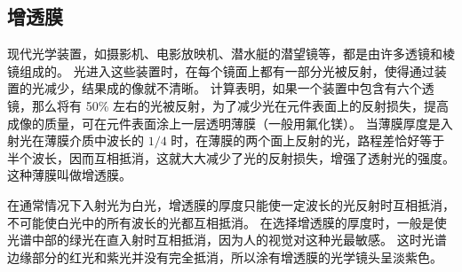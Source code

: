 \subsection{增透膜}

现代光学装置，如摄影机、电影放映机、潜水艇的潜望镜等，都是由许多透镜和棱镜组成的。
光进入这些装置时，在每个镜面上都有一部分光被反射，使得通过装置的光减少，结果成的像就不清晰。
计算表明，如果一个装置中包含有六个透镜，那么将有 50\% 左右的光被反射，为了减少光在元件表面上的反射损失，提高成像的质量，可在元件表面涂上一层透明薄膜（一般用氟化镁）。
当薄膜厚度是入射光在薄膜介质中波长的 $1/4$ 时，在薄膜的两个面上反射的光，路程差恰好等于半个波长，因而互相抵消，这就大大减少了光的反射损失，增强了透射光的强度。这种薄膜叫做增透膜。

在通常情况下入射光为白光，增透膜的厚度只能使一定波长的光反射时互相抵消，不可能使白光中的所有波长的光都互相抵消。
在选择增透膜的厚度时，一般是使光谱中部的绿光在直入射时互相抵消，因为人的视觉对这种光最敏感。
这时光谱边缘部分的红光和紫光并没有完全抵消，所以涂有增透膜的光学镜头呈淡紫色。

